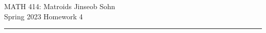 \documentclass[12pt, letterpaper]{article}
\begin{document}
\noindent MATH 414: Matroids \hfill Jinseob Sohn \\
Spring 2023 \hfill Homework 4
\rule[8pt]{\textwidth}{0.6pt}
\end{document}
